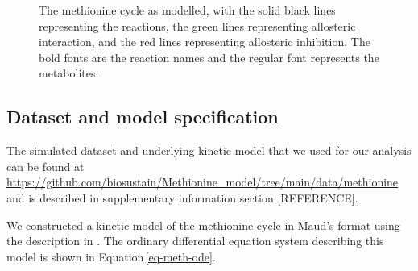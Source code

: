 \documentclass[journal=,manuscript=]{achemso}
\begin{document}
\begin{figure}

\begin{minipage}[t]{\linewidth}

{\centering 


}

\end{minipage}%

\caption{\label{fig-methionine-reactions}The methionine cycle as
modelled, with the solid black lines representing the reactions, the
green lines representing allosteric interaction, and the red lines
representing allosteric inhibition. The bold fonts are the reaction
names and the regular font represents the metabolites.}

\end{figure}

\hypertarget{dataset-and-model-specification}{%
\subsection{Dataset and model
specification}\label{dataset-and-model-specification}}

The simulated dataset and underlying kinetic model that we used for our
analysis can be found at
\url{https://github.com/biosustain/Methionine_model/tree/main/data/methionine}
and is described in supplementary information section {[}REFERENCE{]}.

We constructed a kinetic model of the methionine cycle in Maud's format
using the description in \citet{korendyaseva_allosteric_2008}. The
ordinary differential equation system describing this model is shown in
Equation\,\eqref{eq-meth-ode}.
\end{document}

